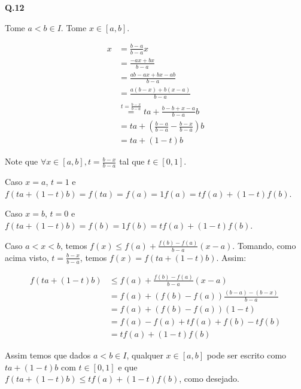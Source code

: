\textbf{Q.12}

Tome $a<b\in I$. Tome $x\in [a,b]$. 

\begin{align*}
	x &= \frac{b-a}{b-a}x \\
	&= \frac{-ax + bx}{b-a} \\
	&= \frac{ab -ax + bx - ab}{b-a} \\
	&= \frac{a(b - x) + b(x - a)}{b-a} \\
	&\overset{t = \frac{b-x}{b-a}}{=} ta + \frac{b-b+x-a}{b-a}b \\
	&= ta + (\frac{b-a}{b-a} - \frac{b-x}{b-a})b \\
	&= ta + (1-t)b
\end{align*}

Note que $\forall x \in [a,b], t = \frac{b-x}{b-a}$ \eh tal que $t \in [0,1]$.

Caso $x = a$, $t=1$ e $f(ta + (1-t)b) = f(ta) = f(a) = 1f(a) = tf(a) + (1-t)f(b)$. 

Caso $x = b$, $t=0$ e $f(ta + (1-t)b) = f(b) = 1f(b) = tf(a) + (1-t)f(b)$. 

Caso $a < x < b$, temos $f(x) \leq f(a) + \frac{f(b)- f(a)}{b-a}(x-a)$. Tomando, como acima visto, $t = \frac{b-x}{b-a}$, temos $f(x) = f(ta + (1-t)b)$. Assim:

\begin{align*}
	f(ta + (1-t)b) &\leq f(a) + \frac{f(b)- f(a)}{b-a}(x-a) \\ 
	&= f(a) + (f(b) - f(a))\frac{(b - a) - (b-x)}{b-a} \\
	&= f(a) + (f(b) - f(a))(1-t) \\
	&= f(a) - f(a) + tf(a) + f(b) - tf(b) \\
	&= tf(a) + (1-t)f(b)
\end{align*}

Assim temos que dados $a < b \in I$, qualquer $x \in [a,b]$ pode ser escrito como $ta + (1-t)b$ com $t\in [0,1]$ e que $f(ta + (1-t)b) \leq tf(a) + (1-t)f(b)$, como desejado.







